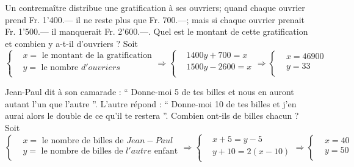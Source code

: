 \begin{solution}
Un contremaître distribue une gratification à ses ouvriers; quand chaque ouvrier prend Fr.  1’400.— il ne reste plus que Fr. 700.—; mais si chaque ouvrier prenait Fr. 1’500.— il  manquerait Fr. 2’600.—. Quel est le montant de cette gratification et combien y a-t-il d’ouvriers ?
Soit $\left\{ \begin{array}{ll}
  & x=\text{ le montant de la gratification} \\ 
 & y=\text{ le nombre }d'ouvriers \\ 
\end{array} \right.\Rightarrow \left\{ \begin{array}{ll}
  & 1400y+700=x \\ 
 & 1500y-2600=x \\ 
\end{array} \right.\Rightarrow \left\{ \begin{array}{ll}
  & x=46900 \\ 
 & y=33 \\ 
\end{array} \right.$
\end{solution}

\begin{solution}
Jean-Paul dit à son camarade : “ Donne-moi 5 de tes billes et nous en auront autant l’un que l’autre ”. L’autre répond : “ Donne-moi 10 de tes billes et j’en aurai alors le double de ce qu’il te restera ”. Combien ont-ils de billes chacun ?
Soit $\left\{ \begin{array}{ll}
  & x=\text{ le nombre de billes de }Jean-Paul \\ 
 & y=\text{ le nombre de billes de }l'autre\text{ enfant} \\ 
\end{array} \right.\Rightarrow \left\{ \begin{array}{ll}
  & x+5=y-5 \\ 
 & y+10=2\left( x-10 \right) \\ 
\end{array} \right.\Rightarrow \left\{ \begin{array}{ll}
  & x=40 \\ 
 & y=50 \\ 
\end{array} \right.$
\end{solution}

